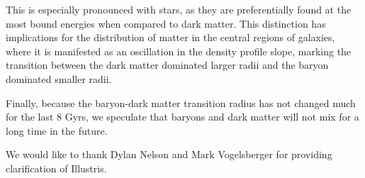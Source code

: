 \documentclass[a4paper,11pt]{article}
\begin{document}
This is especially 
pronounced with stars, as they are preferentially found at the most bound energies when compared to dark matter.  This distinction has implications 
for the distribution of matter in the central regions of galaxies, where it is manifested as an oscillation in the density profile slope, marking the transition between the dark matter dominated 
larger radii and the baryon dominated smaller radii. 

Finally, because the baryon-dark matter transition radius has not changed much for the last 8 Gyrs, we speculate that baryons and dark matter will not mix 
for a long time in the future.

\acknowledgments
We would like to thank Dylan Nelson and Mark Vogelsberger for providing clarification of Illustris.


%

\end{document}
